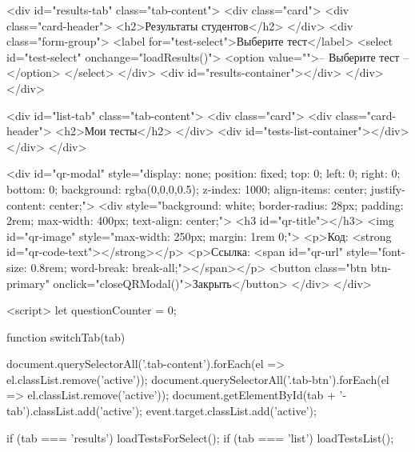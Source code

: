     <div id="results-tab" class="tab-content">
        <div class="card">
            <div class="card-header">
                <h2>Результаты студентов</h2>
            </div>
            <div class="form-group">
                <label for="test-select">Выберите тест</label>
                <select id="test-select" onchange="loadResults()">
                    <option value="">-- Выберите тест --</option>
                </select>
            </div>
            <div id="results-container"></div>
        </div>
    </div>

    <div id="list-tab" class="tab-content">
        <div class="card">
            <div class="card-header">
                <h2>Мои тесты</h2>
            </div>
            <div id="tests-list-container"></div>
        </div>
    </div>

    <div id="qr-modal" style="display: none; position: fixed; top: 0; left: 0; right: 0; bottom: 0; background: rgba(0,0,0,0.5); z-index: 1000; align-items: center; justify-content: center;">
        <div style="background: white; border-radius: 28px; padding: 2rem; max-width: 400px; text-align: center;">
            <h3 id="qr-title"></h3>
            <img id="qr-image" style="max-width: 250px; margin: 1rem 0;">
            <p>Код: <strong id="qr-code-text"></strong></p>
            <p>Ссылка: <span id="qr-url" style="font-size: 0.8rem; word-break: break-all;"></span></p>
            <button class="btn btn-primary" onclick="closeQRModal()">Закрыть</button>
        </div>
    </div>

    <script>
        let questionCounter = 0;

        function switchTab(tab) {
            document.querySelectorAll('.tab-content').forEach(el => el.classList.remove('active'));
            document.querySelectorAll('.tab-btn').forEach(el => el.classList.remove('active'));
            document.getElementById(tab + '-tab').classList.add('active');
            event.target.classList.add('active');
            
            if (tab === 'results') loadTestsForSelect();
            if (tab === 'list') loadTestsList();
        }

